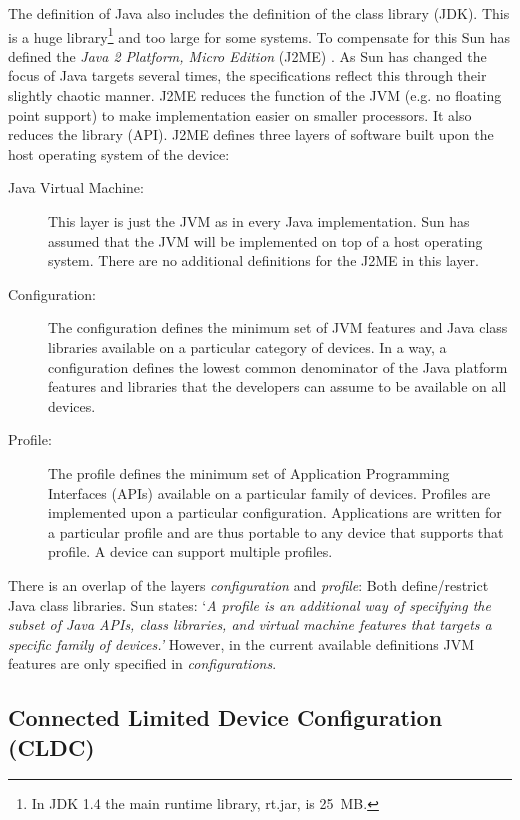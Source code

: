 The definition of Java also includes the definition of the class
library (JDK). This is a huge library\footnote{In JDK 1.4 the main
runtime library, rt.jar, is 25~MB.} and too large for some systems.
To compensate for this Sun has defined the \textit{Java 2 Platform,
Micro Edition} (J2ME) \cite{J2ME}. As Sun has changed the focus of
Java targets several times, the specifications reflect this through
their slightly chaotic manner. J2ME reduces the function of the JVM
(e.g. no floating point support) to make implementation easier on
smaller processors. It also reduces the library (API). J2ME defines
three layers of software built upon the host operating system of the
device:
%
\begin{description}
    \item[Java Virtual Machine:] This layer is just the JVM as in every Java
implementation. Sun has assumed that the JVM will be implemented on
top of a host operating system. There are no additional definitions
for the J2ME in this layer.

    \item[Configuration:] The configuration defines the minimum set of JVM features
and Java class libraries available on a particular category of
devices. In a way, a configuration defines the lowest common
denominator of the Java platform features and libraries that the
developers can assume to be available on all devices.

    \item[Profile:] The profile defines the minimum set of Application
Programming Interfaces (APIs) available on a particular family of
devices. Profiles are implemented upon a particular configuration.
Applications are written for a particular profile and are thus
portable to any device that supports that profile. A device can
support multiple profiles.

\end{description}
%
There is an overlap of the layers \textit{configuration} and
\textit{profile}: Both define/restrict Java class libraries. Sun
states: `\textit{A profile is an additional way of specifying the
subset of Java APIs, class libraries, and virtual machine features
that targets a specific family of devices.'} However, in the current
available definitions JVM features are only specified in
\textit{configurations}.

\subsection{Connected Limited Device Configuration (CLDC)}
\label{subsec:cldc}

